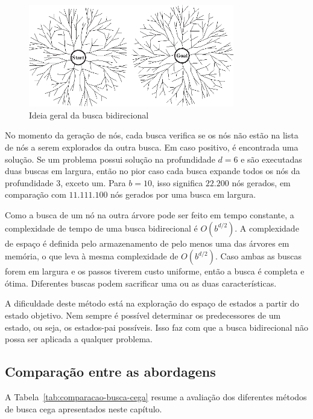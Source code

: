 \begin{figure}[h]
	\centering
	\includegraphics[width=0.8\textwidth]{img/busca-bidirecional}
	\caption{Ideia geral da busca bidirecional}
	\label{fig:busca-bidirecional}
\end{figure}

No momento da geração de nós, cada busca verifica se os nós não estão na lista de nós a serem explorados da outra busca. Em caso positivo, é encontrada uma solução. Se um problema possui solução na profundidade $d = 6$ e são executadas duas buscas em largura, então no pior caso cada busca expande todos os nós da profundidade 3, exceto um. Para $b = 10$, isso significa $22.200$ nós gerados, em comparação com $11.111.100$ nós gerados por uma busca em largura.

Como a busca de um nó na outra árvore pode ser feito em tempo constante, a complexidade de tempo de uma busca bidirecional é $O(b^{d/2})$. A complexidade de espaço é definida pelo armazenamento de pelo menos uma das árvores em memória, o que leva à mesma complexidade de $O(b^{d/2})$. Caso ambas as buscas forem em largura e os passos tiverem custo uniforme, então a busca é completa e ótima. Diferentes buscas podem sacrificar uma ou as duas características.

A dificuldade deste método está na exploração do espaço de estados a partir do estado objetivo. Nem sempre é possível determinar os predecessores de um estado, ou seja, os estados-pai possíveis. Isso faz com que a busca bidirecional não possa ser aplicada a qualquer problema.

\subsection{Comparação entre as abordagens}

A Tabela~\ref{tab:comparacao-busca-cega} resume a avaliação dos diferentes métodos de busca cega apresentados neste capítulo.

